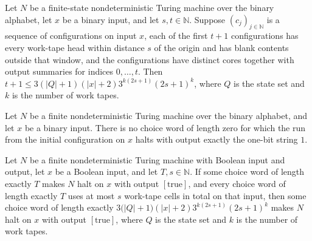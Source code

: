 \begin{theorem}
\label{Turing.FinNDTM.count_windowed_vertices}
\leanok
{}
Let $N$ be a finite-state nondeterministic Turing machine over the binary alphabet, let
$x$ be a binary input, and let $s,t\in\mathbb{N}$. Suppose $(c_j)_{j\in\mathbb{N}}$ is a
sequence of configurations on input $x$, each of the first $t+1$ configurations has
every work-tape head within distance $s$ of the origin and has blank contents outside
that window, and the configurations have distinct cores together with output summaries
for indices $0,\ldots,t$. Then $t+1\le 3(|Q|+1)(|x|+2)3^{k(2s+1)}(2s+1)^k$, where $Q$ is
the state set and $k$ is the number of work tapes.
\end{theorem}

\begin{theorem}
\label{Turing.FinNDTM.not_acceptsWithin_zero}
\leanok
{}
Let $N$ be a finite nondeterministic Turing machine over the binary alphabet, and let
$x$ be a binary input. There is no choice word of length zero for which the run from the
initial configuration on $x$ halts with output exactly the one-bit string $1$.
\end{theorem}

\begin{theorem}
\label{Turing.FinNDTM.acceptsWithin_of_spaceUsedWith_le}
\leanok
{}
Let $N$ be a finite nondeterministic Turing machine with Boolean input and output, let
$x$ be a Boolean input, and let $T,s\in\mathbb{N}$. If some choice word of length
exactly $T$ makes $N$ halt on $x$ with output $[\mathrm{true}]$, and every choice word
of length exactly $T$ uses at most $s$ work-tape cells in total on that input, then some
choice word of length exactly $3\bigl(|Q|+1\bigr)(|x|+2)3^{k(2s+1)}(2s+1)^k$ makes $N$
halt on $x$ with output $[\mathrm{true}]$, where $Q$ is the state set and $k$ is the
number of work tapes.
\end{theorem}

